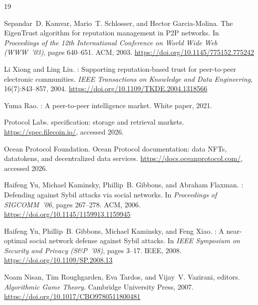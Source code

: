 \documentclass[sigconf,nonacm,10pt]{acmart}
\begin{document}

\begin{thebibliography}{19}

Sepandar~D. Kamvar, Mario~T. Schlosser, and Hector Garcia-Molina.
\newblock The {EigenTrust} algorithm for reputation management
  in {P2P} networks.
\newblock In \emph{Proceedings of the 12th International Conference
  on World Wide Web (WWW~'03)}, pages 640--651. ACM, 2003.
\newblock \url{https://doi.org/10.1145/775152.775242}

Li Xiong and Ling Liu.
: Supporting reputation-based trust for
  peer-to-peer electronic communities.
\newblock \emph{IEEE Transactions on Knowledge and Data
  Engineering}, 16(7):843--857, 2004.
\newblock \url{https://doi.org/10.1109/TKDE.2004.1318566}

Yuma Rao.
: A peer-to-peer intelligence market.
\newblock White paper, 2021.

Protocol Labs.
 specification: storage and retrieval markets.
\newblock \url{https://spec.filecoin.io/}, accessed 2026.

Ocean Protocol Foundation.
\newblock Ocean Protocol documentation: data {NFTs}, datatokens, and
  decentralized data services.
\newblock \url{https://docs.oceanprotocol.com/}, accessed 2026.

Haifeng Yu, Michael Kaminsky, Phillip~B. Gibbons, and Abraham
  Flaxman.
: Defending against {Sybil} attacks via
  social networks.
\newblock In \emph{Proceedings of SIGCOMM~'06}, pages 267--278.
  ACM, 2006.
\newblock \url{https://doi.org/10.1145/1159913.1159945}

Haifeng Yu, Phillip~B. Gibbons, Michael Kaminsky, and Feng Xiao.
: A near-optimal social network defense
  against {Sybil} attacks.
\newblock In \emph{IEEE Symposium on Security and Privacy
  (S\&P~'08)}, pages 3--17. IEEE, 2008.
\newblock \url{https://doi.org/10.1109/SP.2008.13}

Noam Nisan, Tim Roughgarden, Eva Tardos, and Vijay~V. Vazirani,
  editors.
\newblock \emph{Algorithmic Game Theory}.
\newblock Cambridge University Press, 2007.
\newblock \url{https://doi.org/10.1017/CBO9780511800481}


\end{thebibliography}
\end{document}
